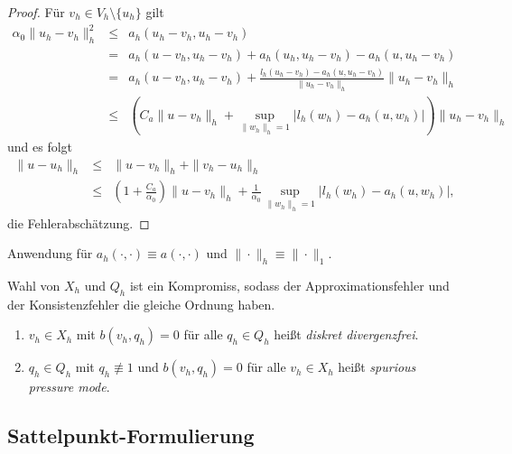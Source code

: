 \begin{proof}
    Für $v_h\in V_h \setminus\{u_h\}$ gilt
    \begin{eqnarray*}
              \alpha_0 \|u_h - v_h\|_h^2
        &\le& a_h(u_h - v_h, u_h - v_h) \\
        &=& a_h(u - v_h, u_h - v_h) + a_h(u_h, u_h - v_h) - a_h(u, u_h - v_h) \\
        &=& a_h(u - v_h, u_h - v_h) + \frac{l_h(u_h - v_h) - a_h(u, u_h - v_h)}
            {\|u_h - v_h\|_h} \|u_h - v_h\|_h \\
        &\le& (C_a \|u - v_h\|_h + \sup_{\|w_h\|_h = 1} |l_h(w_h) -
              a_h(u, w_h)|) \|u_h - v_h\|_h
    \end{eqnarray*}
    und es folgt
    \begin{eqnarray*}
              \|u - u_h\|_h
        &\le& \|u - v_h\|_h + \|v_h - u_h\|_h \\
        &\le& \left(1 + \frac{C_a}{\alpha_0}\right)\|u - v_h\|_h +
              \frac{1}{\alpha_0} \sup_{\|w_h\|_h = 1} |l_h(w_h) - a_h(u, w_h)|,
    \end{eqnarray*}
    die Fehlerabschätzung.
\end{proof}


\begin{Bemerkung}
    Anwendung für $a_h(\cdot, \cdot) \equiv a(\cdot, \cdot)$ und $\|\cdot\|_h
    \equiv \|\cdot\|_1$.
\end{Bemerkung}


\begin{Bemerkung}
    Wahl von $X_h$ und $Q_h$ ist ein Kompromiss, sodass der Approximationsfehler
    und der Konsistenzfehler die gleiche Ordnung haben.
\end{Bemerkung}


\begin{Bezeichnung}
    \begin{enumerate}[1)]
      \item  
        $v_h\in X_h$ mit $b(v_h, q_h) = 0$ für alle $q_h\in Q_h$ hei\ss{}t
        \emph{diskret divergenzfrei}.
      \item
        $q_h\in Q_h$ mit $q_h \not\equiv 1$ und $b(v_h, q_h) = 0$ für alle
        $v_h\in X_h$ hei\ss{}t \emph{spurious pressure mode}.
    \end{enumerate}
\end{Bezeichnung}


\subsection{Sattelpunkt-Formulierung}



